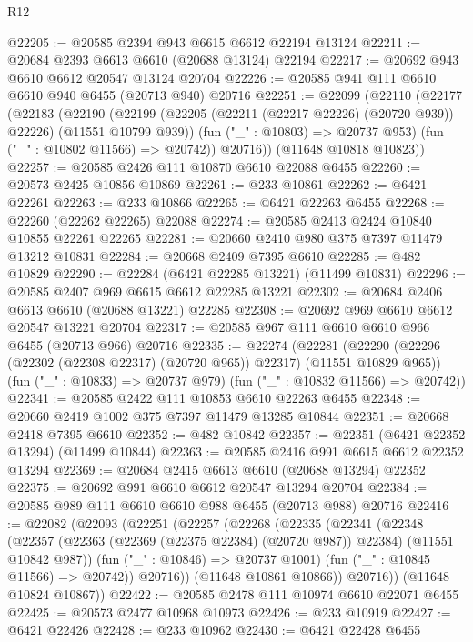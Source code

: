 \begin{lexlean}{R12}
\begin{coremodule}
{{{{{{{{{{{{{{{{{{{{{{{{{{{{{{{{{{{{{{{{{{{{{{{{{{{{{{{{{{{{{{{{{{{{{{{{{{{{{{{{{{@22205 := @20585 @2394 @943 @6615 @6612 @22194 @13124
@22211 := @20684 @2393 @6613 @6610 (@20688 @13124) @22194
@22217 := @20692 @943 @6610 @6612 @20547 @13124 @20704
@22226 := @20585 @941 @111 @6610 @6610 @940 @6455 (@20713 @940) @20716
@22251 := @22099
    (@22110
      (@22177
        (@22183
          (@22190
            (@22199 (@22205 (@22211 (@22217 @22226) (@20720 @939)) @22226) (@11551 @10799 @939))
            (fun ("_" : @10803) => @20737 @953)
            (fun ("_" : @10802 @11566) => @20742))
          @20716))
      (@11648 @10818 @10823))
@22257 := @20585 @2426 @111 @10870 @6610 @22088 @6455
@22260 := @20573 @2425 @10856 @10869
@22261 := @233 @10861
@22262 := @6421 @22261
@22263 := @233 @10866
@22265 := @6421 @22263 @6455
@22268 := @22260 (@22262 @22265) @22088
@22274 := @20585 @2413 @2424 @10840 @10855 @22261 @22265
@22281 := @20660 @2410 @980 @375 @7397 @11479 @13212 @10831
@22284 := @20668 @2409 @7395 @6610
@22285 := @482 @10829
@22290 := @22284 (@6421 @22285 @13221) (@11499 @10831)
@22296 := @20585 @2407 @969 @6615 @6612 @22285 @13221
@22302 := @20684 @2406 @6613 @6610 (@20688 @13221) @22285
@22308 := @20692 @969 @6610 @6612 @20547 @13221 @20704
@22317 := @20585 @967 @111 @6610 @6610 @966 @6455 (@20713 @966) @20716
@22335 := @22274
    (@22281
      (@22290 (@22296 (@22302 (@22308 @22317) (@20720 @965)) @22317) (@11551 @10829 @965))
      (fun ("_" : @10833) => @20737 @979)
      (fun ("_" : @10832 @11566) => @20742))
@22341 := @20585 @2422 @111 @10853 @6610 @22263 @6455
@22348 := @20660 @2419 @1002 @375 @7397 @11479 @13285 @10844
@22351 := @20668 @2418 @7395 @6610
@22352 := @482 @10842
@22357 := @22351 (@6421 @22352 @13294) (@11499 @10844)
@22363 := @20585 @2416 @991 @6615 @6612 @22352 @13294
@22369 := @20684 @2415 @6613 @6610 (@20688 @13294) @22352
@22375 := @20692 @991 @6610 @6612 @20547 @13294 @20704
@22384 := @20585 @989 @111 @6610 @6610 @988 @6455 (@20713 @988) @20716
@22416 := @22082
    (@22093
      (@22251
        (@22257
          (@22268
            (@22335
              (@22341
                (@22348
                  (@22357
                    (@22363 (@22369 (@22375 @22384) (@20720 @987)) @22384)
                    (@11551 @10842 @987))
                  (fun ("_" : @10846) => @20737 @1001)
                  (fun ("_" : @10845 @11566) => @20742))
                @20716))
            (@11648 @10861 @10866))
          @20716))
      (@11648 @10824 @10867))
@22422 := @20585 @2478 @111 @10974 @6610 @22071 @6455
@22425 := @20573 @2477 @10968 @10973
@22426 := @233 @10919
@22427 := @6421 @22426
@22428 := @233 @10962
@22430 := @6421 @22428 @6455
}}}}}}}}}}}}}}}}}}}}}}}}}}}}}}}}}}}}}}}}}}}}}}}}}}}}}}}}}}}}}}}}}}}}}}}}}}}}}}}}}}
\end{coremodule}
\end{lexlean}
